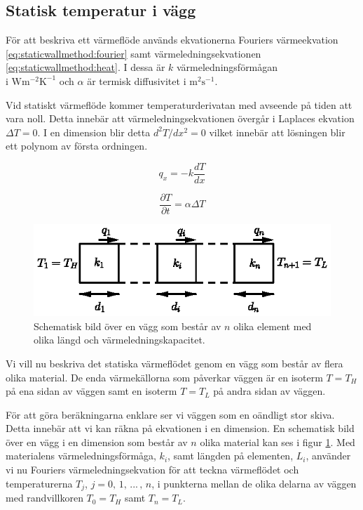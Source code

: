 \subsection{Statisk temperatur i vägg}

För att beskriva ett värmeflöde används ekvationerna Fouriers värmeekvation
\eqref{eq:staticwallmethod:fourier} samt värmeledningsekvationen
\eqref{eq:staticwallmethod:heat}. I dessa är
$k$ värmeledningsförmågan\\i $\mbox{W}\mbox{m}^{-2}\mbox{K}^{-1}$ och
$\alpha$ är termisk diffusivitet i $\mbox{m}^2\mbox{s}^{-1}$. \cite{physicshandbook}

Vid statiskt värmeflöde kommer temperaturderivatan med avseende på tiden att vara noll.
Detta innebär att värmeledningsekvationen övergår i Laplaces ekvation
$\Delta{}T = 0$. I en dimension blir detta $d^2T/dx^2 = 0$ vilket innebär
att lösningen blir ett polynom av första ordningen.  

\begin{equation}
\label{eq:staticwallmethod:fourier}
q_x = -k\frac{dT}{dx}
\end{equation}

\begin{equation}
\label{eq:staticwallmethod:heat}
\frac{\partial{}T}{\partial{}t} = \alpha\Delta{}T
\end{equation}

\begin{figure}
\centering
\includegraphics{images/wall.eps}
\caption{Schematisk bild över en vägg som består av $n$ olika element med olika
längd och värmeledningskapacitet.}\label{fig:staticwallmethod:wall}
\end{figure}

\noindent
Vi vill nu beskriva det statiska värmeflödet genom en vägg som består
av flera olika material. De enda värmekällorna som påverkar väggen
är en isoterm $T = T_H$ på ena sidan av väggen
samt en isoterm $T = T_L$ på andra sidan av väggen.

För att göra beräkningarna enklare
ser vi väggen som en oändligt stor skiva. Detta innebär att vi kan räkna
på ekvationen i en dimension. 
En schematisk bild över en vägg i en dimension som består av
$n$ olika material kan ses i figur \ref{fig:staticwallmethod:wall}.
Med materialens värmeledningsförmåga, $k_i$, samt längden
på elementen, $L_i$, använder vi nu Fouriers värmeledningsekvation för
att teckna värmeflödet och temperaturerna $T_j$,  $j=0,\,1,\,...\,,\,n$, i punkterna
mellan de olika delarna av väggen med randvillkoren $T_0 = T_H$ samt
$T_n = T_L$.

